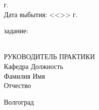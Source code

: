\begin{titlepage}
\begin{flushleft}
        \the\year г.\\
        Дата выбытия: \hspace{3cm}<<\underline{\hspace{1cm}}>> \underline{\hspace{3cm}} 
        \the\year г.
    \end{flushleft}
    \vspace{0.5cm}
     задание: \underline{\hspace{11.25cm}}\\
    \underline{\hspace{\textwidth}}\\
    \vspace{0.5cm}
    \begin{flushleft}
        РУКОВОДИТЕЛЬ ПРАКТИКИ\\
        Кафедра \underline{\hspace{5.15cm}} Должность \underline{\hspace{5cm}} \\
        Фамилия \underline{\hspace{5cm}} Имя \underline{\hspace{6.5cm}}\\
        Отчество \underline{\hspace{5cm}}
    \end{flushleft}
    \vspace{\fill}
    \begin{center}
        Волгоград \the\year
    \end{center}
\end{titlepage}
